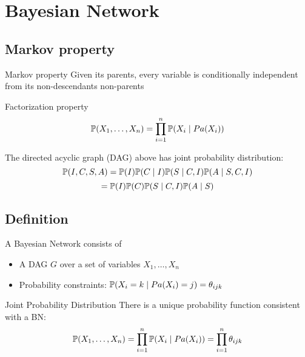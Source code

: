 \section{Bayesian Network}

\subsection{Markov property}
	\begin{frame}
		\begin{block}{Markov property}
			Given its parents, every variable is conditionally independent from its non-descendants non-parents
		\end{block}
		\begin{block}{Factorization property}
			\[ \P( X_1 , \ldots , X_n ) = \prod_{i=1}^n \P( X_i \mid {Pa}( X_i ) ) \]
		\end{block}
	\end{frame}
	
	\begin{frame}[fragile]
		\begin{figure}
	 		\centering
			
		\end{figure}
		\begin{block}{}
			The directed acyclic graph (DAG) above has joint probability distribution:
			\[ \P( I , C , S , A ) = \P( I ) \P( C \mid I ) \P( S \mid C , I ) \P( A \mid S , C , I ) \]
			\[ = \P( I ) \P( C ) \P( S \mid C , I ) \P( A \mid S ) \]
		\end{block}
	\end{frame}

\subsection{Definition}
	\begin{frame}
		A Bayesian Network consists of
		\begin{itemize}
			\item A DAG $G$ over a set of variables $X_1 , \ldots , X_n$
			\item \alert{Probability constraints}: $\P( X_i = k \mid {Pa}( X_i ) = j ) = \theta_{ijk}$
		\end{itemize}
		\begin{block}{Joint Probability Distribution}
			There is a unique probability function consistent with a BN:
			\[ \P( X_1 , \ldots , X_n ) = \prod_{i=1}^n \P( X_i \mid {Pa}( X_i ) ) = \prod_{i=1}^n \theta_{ijk} \]
		\end{block}
	\end{frame}

